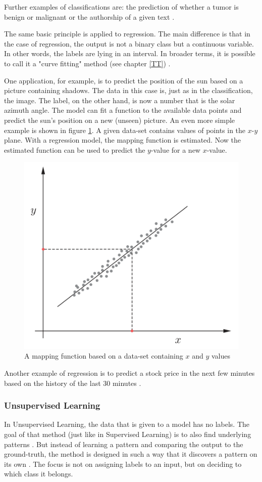 Further examples of classifications are: the prediction of whether a tumor is benign or malignant or the authorship of a given text \cite{Theodoridis}.


The same basic principle is applied to regression. The main difference is that in the case of regression, the output is not a binary class but a continuous variable. In other words, the labels are lying in an interval. In broader terms, it is possible to call it a "curve fitting" method (see chapter \ref{TT}) \cite{Theodoridis}.

One application, for example, is to predict the position of the sun based on a picture containing shadows. The data in this case is, just as in the classification, the image. The label, on the other hand, is now a number that is the solar azimuth angle. The model can fit a function to the available data points and predict the sun's position on a new (unseen) picture.
An even more simple example is shown in figure \ref{fig:SimpleRegression}. A given data-set contains values of points in the \(x\)-\(y\) plane. With a regression model, the mapping function is estimated. Now the estimated function can be used to predict the \(y\)-value for a new \(x\)-value. 

\begin{figure}[H]
	\centering
	\includegraphics[width=0.5\linewidth]{IMGs/SimpleRegression.png}
	\caption{A mapping function based on a data-set containing \(x\) and \(y\) values \cite{Theodoridis}}
	\label{fig:SimpleRegression}
\end{figure}


Another example of regression is to predict a stock price in the next few minutes based on the history of the last 30 minutes \cite{Janiesch}.



\subsubsection*{Unsupervised Learning}
In Unsupervised Learning, the data that is given to a model has no labels. The goal of that method (just like in Supervised Learning) is to also find underlying patterns \cite{Carleo}. But instead of learning a pattern and comparing the output to the ground-truth, the method is designed in such a way that it discovers a pattern on its own \cite{Murphy}. The focus is not on assigning labels to an input, but on deciding to which class it belongs.

